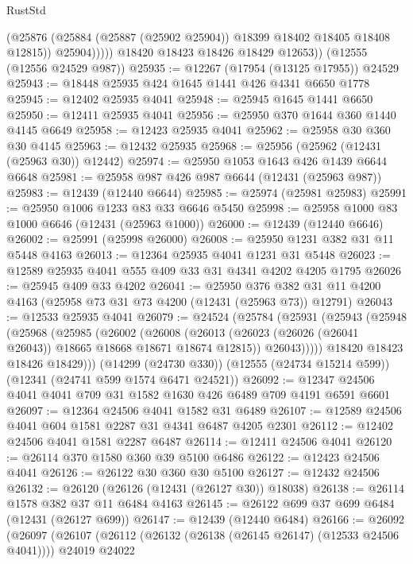 \begin{lexlean}{RustStd}
\begin{coremodule}
                  (@25876 (@25884 (@25887 (@25902 @25904)) @18399 @18402 @18405 @18408 @12815))
                  @25904)))))
        @18420
        @18423
        @18426
        @18429
        @12653))
    (@12555 (@12556 @24529 @987))
@25935 := @12267 (@17954 (@13125 @17955)) @24529
@25943 := @18448 @25935 @424 @1645 @1441 @426 @4341 @6650 @1778
@25945 := @12402 @25935 @4041
@25948 := @25945 @1645 @1441 @6650
@25950 := @12411 @25935 @4041
@25956 := @25950 @370 @1644 @360 @1440 @4145 @6649
@25958 := @12423 @25935 @4041
@25962 := @25958 @30 @360 @30 @4145
@25963 := @12432 @25935
@25968 := @25956 (@25962 (@12431 (@25963 @30)) @12442)
@25974 := @25950 @1053 @1643 @426 @1439 @6644 @6648
@25981 := @25958 @987 @426 @987 @6644 (@12431 (@25963 @987))
@25983 := @12439 (@12440 @6644)
@25985 := @25974 (@25981 @25983)
@25991 := @25950 @1006 @1233 @83 @33 @6646 @5450
@25998 := @25958 @1000 @83 @1000 @6646 (@12431 (@25963 @1000))
@26000 := @12439 (@12440 @6646)
@26002 := @25991 (@25998 @26000)
@26008 := @25950 @1231 @382 @31 @11 @5448 @4163
@26013 := @12364 @25935 @4041 @1231 @31 @5448
@26023 := @12589 @25935 @4041 @555 @409 @33 @31 @4341 @4202 @4205 @1795
@26026 := @25945 @409 @33 @4202
@26041 := @25950
    @376
    @382
    @31
    @11
    @4200
    @4163
    (@25958 @73 @31 @73 @4200 (@12431 (@25963 @73)) @12791)
@26043 := @12533 @25935 @4041
@26079 := @24524
    (@25784
      (@25931
        (@25943
          (@25948
            (@25968
              (@25985
                (@26002
                  (@26008
                    (@26013 (@26023 (@26026 (@26041 @26043)) @18665 @18668 @18671 @18674 @12815))
                    @26043)))))
          @18420
          @18423
          @18426
          @18429)))
    (@14299 (@24730 @330))
    (@12555 (@24734 @15214 @599))
    (@12341 (@24741 @599 @1574 @6471 @24521))
@26092 := @12347 @24506 @4041 @4041 @709 @31 @1582 @1630 @426 @6489 @709 @4191 @6591 @6601
@26097 := @12364 @24506 @4041 @1582 @31 @6489
@26107 := @12589 @24506 @4041 @604 @1581 @2287 @31 @4341 @6487 @4205 @2301
@26112 := @12402 @24506 @4041 @1581 @2287 @6487
@26114 := @12411 @24506 @4041
@26120 := @26114 @370 @1580 @360 @39 @5100 @6486
@26122 := @12423 @24506 @4041
@26126 := @26122 @30 @360 @30 @5100
@26127 := @12432 @24506
@26132 := @26120 (@26126 (@12431 (@26127 @30)) @18038)
@26138 := @26114 @1578 @382 @37 @11 @6484 @4163
@26145 := @26122 @699 @37 @699 @6484 (@12431 (@26127 @699))
@26147 := @12439 (@12440 @6484)
@26166 := @26092
    (@26097
      (@26107
        (@26112 (@26132 (@26138 (@26145 @26147) (@12533 @24506 @4041))))
        @24019
        @24022

\end{coremodule}
\end{lexlean}
